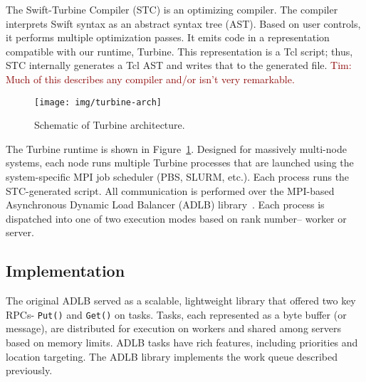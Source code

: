 \documentclass[conference,10pt]{IEEEtran}
\newcommand{\arm}[1]{ {\textcolor{darkred} { Tim: #1 }}}
\newcommand{\arm}[1]{}
\begin{document}
The Swift-Turbine Compiler (STC) is an optimizing compiler.  The
compiler interprets Swift syntax as an abstract syntax tree (AST).
Based on user controls, it performs multiple optimization passes.  It
emits code in a representation compatible with our runtime, Turbine.
This representation is a Tcl script; thus, STC internally generates a
Tcl AST and writes that to the generated file.  \arm{Much of this
  describes any compiler and/or isn't very remarkable.}

\begin{figure}[h]
  \begin{center}
    \texttt{[image: img/turbine-arch]}
    \caption{Schematic of Turbine architecture. 
      \label{figure:turbine-arch}}
  \end{center}
\end{figure}

The Turbine runtime is shown in Figure~\ref{figure:turbine-arch}.
Designed for massively multi-node systems, each node runs multiple
Turbine processes that are launched using the system-specific MPI job
scheduler (PBS, SLURM, etc.).  Each process
runs the STC-generated script.  All communication is performed over
the MPI-based Asynchronous Dynamic Load Balancer (ADLB)
library~\cite{ADLB_2010}. Each process
is dispatched into one of two execution modes based on rank number--
worker or server.

\subsection{Implementation}

The original ADLB served as a scalable, lightweight library that
offered two key RPCs- {\tt Put()} and {\tt Get()} on tasks.  Tasks,
each represented as a byte buffer (or message), are distributed for
execution on workers and shared among servers based on memory limits.
ADLB tasks have rich features, including priorities and location
targeting.  The ADLB library implements the work queue described
previously.
\end{document}
